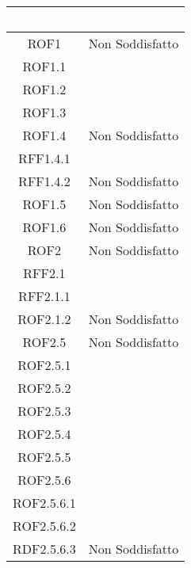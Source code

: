 \begin{center}
\begin{longtable}[c]{|c|c|}
\hline
\rowcolor{bluelogo}\textbf{\textcolor{white}{Requisito}} & \textbf{\textcolor{white}{Stato}}\\
\hline \hline
\endhead
ROF1 & \cellcolor{rosso}Non Soddisfatto\\
\hline
ROF1.1 & \cellcolor{verde}\textcolor{white}{Soddisfatto}\\
\hline
ROF1.2 & \cellcolor{verde}\textcolor{white}{Soddisfatto}\\
\hline
ROF1.3 & \cellcolor{verde}\textcolor{white}{Soddisfatto}\\
\hline
ROF1.4 & \cellcolor{rosso}Non Soddisfatto\\
\hline
RFF1.4.1 & \cellcolor{verde}\textcolor{white}{Soddisfatto}\\
\hline
RFF1.4.2 & \cellcolor{rosso}Non Soddisfatto\\
\hline
ROF1.5 & \cellcolor{rosso}Non Soddisfatto\\
\hline
ROF1.6 & \cellcolor{rosso}Non Soddisfatto\\
\hline
ROF2 & \cellcolor{rosso}Non Soddisfatto\\
\hline
RFF2.1 & \cellcolor{verde}\textcolor{white}{Soddisfatto}\\
\hline
RFF2.1.1 & \cellcolor{verde}\textcolor{white}{Soddisfatto}\\
\hline
ROF2.1.2 & \cellcolor{rosso}Non Soddisfatto\\
\hline
ROF2.5 & \cellcolor{rosso}Non Soddisfatto\\
\hline
ROF2.5.1 & \cellcolor{verde}\textcolor{white}{Soddisfatto}\\
\hline
ROF2.5.2 & \cellcolor{verde}\textcolor{white}{Soddisfatto}\\
\hline
ROF2.5.3 & \cellcolor{verde}\textcolor{white}{Soddisfatto}\\
\hline
ROF2.5.4 & \cellcolor{verde}\textcolor{white}{Soddisfatto}\\
\hline
ROF2.5.5 & \cellcolor{verde}\textcolor{white}{Soddisfatto}\\
\hline
ROF2.5.6 & \cellcolor{verde}\textcolor{white}{Soddisfatto}\\
\hline
ROF2.5.6.1 & \cellcolor{verde}\textcolor{white}{Soddisfatto}\\
\hline
ROF2.5.6.2 & \cellcolor{verde}\textcolor{white}{Soddisfatto}\\
\hline
RDF2.5.6.3 & \cellcolor{rosso}Non Soddisfatto\\

\end{longtable}
\end{center}
